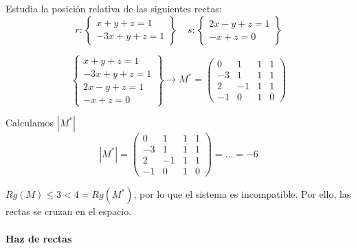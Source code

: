 \begin{problem}
Estudia la posición relativa de las siguientes rectas:
\[
r: 
\left\{
\begin{array}{l}
x+y+z=1\\
-3x+y+z=1
\end{array}
\right\}\;\;\;\;
s: 
\left\{
\begin{array}{l}
2x-y+z=1\\
-x+z=0
\end{array}
\right\}
\]
\solution

\[
\left\{
\begin{array}{l}
x+y+z=1\\
-3x+y+z=1\\
2x-y+z=1\\
-x+z=0
\end{array}
\right\} \to M^\ast=\begin{pmatrix}
0&1&1&1\\-3&1&1&1\\2&-1&1&1\\-1&0&1&0
\end{pmatrix}
\]

Calculamos $|M^\ast|$
\[
|M^\ast|=\begin{pmatrix}
0&1&1&1\\-3&1&1&1\\2&-1&1&1\\-1&0&1&0
\end{pmatrix} = ... = -6
\]

$Rg(M) \leq 3 < 4 = Rg(M^\ast)$, por lo que el sistema es incompatible.
%
Por ello, las rectas se cruzan en el espacio.

\end{problem}

\paragraph{Haz de rectas}

